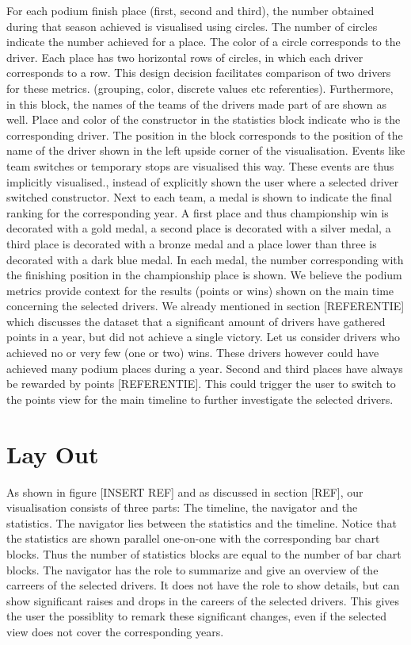 \documentclass{sigchi}
\begin{document}
For each podium finish place (first, second and third), the number obtained during that season achieved is visualised using circles. The number of circles indicate the number achieved for a place. The color of a circle corresponds to the driver. Each place has two horizontal rows of circles, in which each driver corresponds to a row. This design decision facilitates comparison of two drivers for these metrics. (grouping, color, discrete values etc referenties). Furthermore, in this block, the names of the teams of the drivers made part of are shown as well. Place and color of the constructor in the statistics block indicate who is the corresponding driver. The position in the block corresponds to the position of the name of the driver shown in the left upside corner of the visualisation.  Events like team switches or temporary stops are visualised this way. These events are thus implicitly visualised., instead of explicitly shown  the user where a selected driver switched constructor. Next to each team, a medal is shown to indicate the final ranking for the corresponding year. A first place and thus championship win is decorated with a gold medal, a second place is decorated with a silver medal, a third place is decorated with a bronze medal and a place lower than three is decorated with a dark blue medal. In each medal, the number corresponding with the finishing position in the championship place is shown. We believe the podium metrics provide context for the results (points or wins) shown on the main time concerning the selected drivers. We already mentioned in section [REFERENTIE] which discusses the dataset that a significant amount of drivers have gathered points in a year, but did not achieve a single victory. Let us consider drivers who achieved no or very few (one or two) wins. These drivers however could have achieved many podium places during a year. Second and third places have always be rewarded by points [REFERENTIE]. This could trigger the user to switch to the points view for the main timeline to further investigate the selected drivers.
\section{Lay Out}
As shown in figure [INSERT REF] and as discussed in section [REF], our visualisation consists of three parts: The timeline, the navigator and the statistics. The navigator lies between the statistics and the timeline. Notice that the statistics are shown parallel one-on-one with the corresponding bar chart blocks. Thus the number of statistics blocks are equal to the number of bar chart blocks. The navigator has the role to summarize and give an overview of the carreers of the selected drivers. It does not have the role to show details, but can show significant raises and drops in the careers of the selected drivers. This gives the user the possiblity to remark these significant changes, even if the selected view does not cover the corresponding years. 
\end{document}
